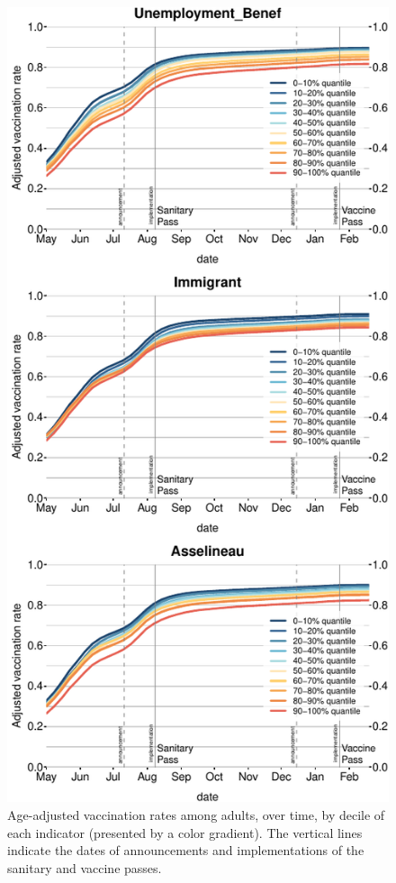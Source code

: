\documentclass[
]{article}
\begin{document}
\begin{figure}
\centering
\includegraphics{ms_files/figure-latex/figOverTime-1.pdf}
\caption{\label{fig:figOverTime}Age-adjusted vaccination rates among adults, over time, by decile of each indicator (presented by a color gradient). The vertical lines indicate the dates of announcements and implementations of the sanitary and vaccine passes.}
\end{figure}
\end{document}
